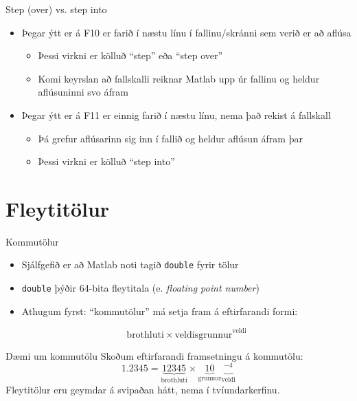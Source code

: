 \documentclass{beamer}
\begin{document}
\begin{frame}{Step (over) vs. step into}
\begin{itemize}
 \item Þegar ýtt er á F10 er farið í næstu línu í fallinu/skránni sem verið er að aflúsa
 \begin{itemize}
  \item Þessi virkni er kölluð ``step'' eða ``step over''
  \item Komi keyrslan að fallskalli reiknar Matlab upp úr fallinu og heldur aflúsuninni svo áfram
 \end{itemize}
 \item Þegar ýtt er á F11 er einnig farið í næstu línu, nema það rekist á fallskall
 \begin{itemize}
  \item Þá grefur aflúsarinn sig inn í fallið og heldur aflúsun áfram þar
  \item Þessi virkni er kölluð ``step into'' 
 \end{itemize}
\end{itemize}
\end{frame}

\section{Fleytitölur}

\begin{frame}{Kommutölur}
\begin{itemize}
 \item Sjálfgefið er að Matlab noti tagið \texttt{double} fyrir tölur
 \item \texttt{double} þýðir 64-bita fleytitala (e. \emph{floating point number})
 \item Athugum fyrst: ``kommutölur'' má setja fram á eftirfarandi formi:

 \[
 \text{brothluti} \times \text{veldisgrunnur}^\text{veldi}
\]
\end{itemize}
\end{frame}

\begin{frame}{Dæmi um kommutölu}
Skoðum eftirfarandi framsetningu á kommutölu:
 \[
1.2345 = \underbrace{12345}_\text{brothluti} \times \underbrace{10}_\text{grunnur}\underbrace{{}^{-4}}_\text{veldi}
\]
Fleytitölur eru geymdar á svipaðan hátt, nema í tvíundarkerfinu.
\end{frame}
\end{document}
